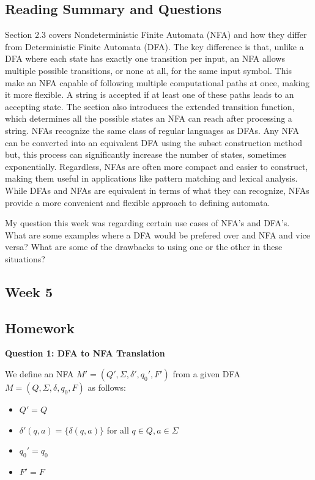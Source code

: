 \documentclass{article}
\theoremstyle{theorem}
\theoremstyle{definition}
\theoremstyle{remark}
\begin{document}
\subsection*{Reading Summary and Questions}

Section 2.3 covers Nondeterministic Finite Automata (NFA) and how they differ from Deterministic Finite Automata (DFA). The key difference is that, unlike a DFA where each state has exactly one transition per input, 
an NFA allows multiple possible transitions, or none at all, for the same input symbol. This make an NFA capable of following multiple computational paths at once, making it more flexible. A string is accepted if at least one 
of these paths leads to an accepting state. The section also introduces the extended transition function, which determines all the possible states an NFA can reach after processing a string. NFAs recognize the same class of 
regular languages as DFAs. Any NFA can be converted into an equivalent DFA using the subset construction method but, this process can significantly increase the number of states, sometimes exponentially. Regardless, NFAs are 
often more compact and easier to construct, making them useful in applications like pattern matching and lexical analysis. While DFAs and NFAs are equivalent in terms of what they can recognize, NFAs provide a more 
convenient and flexible approach to defining automata.

\smallskip

My question this week was regarding certain use cases of NFA's and DFA's. What are some examples where a DFA would be prefered over and NFA and vice versa? What are some of the drawbacks to using one or the other 
in these situations?



\subsection{Week 5}
\smallskip

 
\subsection*{Homework}

\textbf{Question 1: DFA to NFA Translation}

We define an NFA $M' = (Q', \Sigma, \delta', q_0', F')$ from a given DFA $M = (Q, \Sigma, \delta, q_0, F)$ as follows:
\begin{itemize}
    \item $Q' = Q$
    \item $\delta'(q, a) = \{ \delta(q, a) \}$ for all $q \in Q, a \in \Sigma$
    \item $q_0' = q_0$
    \item $F' = F$
\end{itemize}
\end{document}
